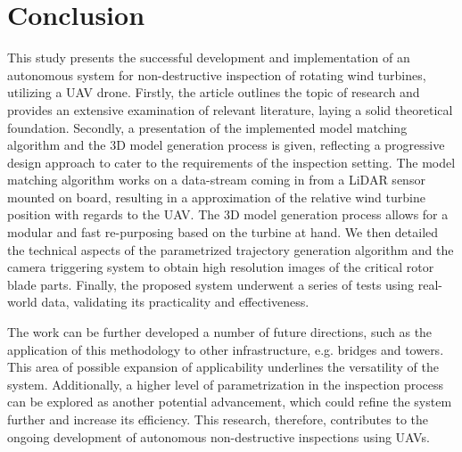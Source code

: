 \section{Conclusion}
\label{sec:conclusion}

This study presents the successful development and implementation of an autonomous system for non-destructive inspection of rotating wind turbines, utilizing a UAV drone. Firstly, the article outlines the topic of research and provides an extensive examination of relevant literature, laying a solid theoretical foundation. Secondly, a presentation of the implemented model matching algorithm and the 3D model generation process is given, reflecting a progressive design approach to cater to the requirements of the inspection setting. The model matching algorithm works on a data-stream coming in from a LiDAR sensor mounted on board, resulting in a approximation of the relative wind turbine position with regards to the UAV. The 3D model generation process allows for a modular and fast re-purposing based on the turbine at hand. We then detailed the technical aspects of the parametrized trajectory generation algorithm and the camera triggering system to obtain high resolution images of the critical rotor blade parts. Finally, the proposed system underwent a series of tests using real-world data, validating its practicality and effectiveness.

The work can be further developed a number of future directions, such as the application of this methodology to other infrastructure, e.g. bridges and towers. This area of possible expansion of applicability underlines the versatility of the system. Additionally, a higher level of parametrization in the inspection process can be explored as another potential advancement, which could refine the system further and increase its efficiency. This research, therefore, contributes to the ongoing development of autonomous non-destructive inspections using UAVs.